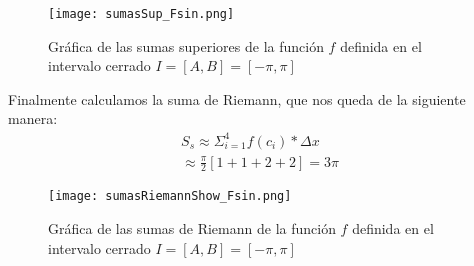 \begin{ejer}[3]
			    \begin{figure}[h]
				    \texttt{[image: sumasSup\_Fsin.png]}
				    \caption{Gráfica de las sumas superiores de la función $f$ definida en el intervalo cerrado $I = [A,B] = [-\pi,\pi]$}
			    \end{figure}
			    Finalmente calculamos la suma de Riemann, que nos queda de la siguiente manera: 
			    \begin{eqnarray*}
			        S_s \approx \Sigma_{i=1}^4 f(c_i) * \Delta x \\
			        \approx \frac{\pi}{2} [1 + 1 + 2 + 2] = 3 \pi 
			    \end{eqnarray*}
			    \begin{figure}[h]
				    \texttt{[image: sumasRiemannShow\_Fsin.png]}
				    \caption{Gráfica de las sumas de Riemann de la función $f$ definida en el intervalo cerrado $I = [A,B] = [-\pi,\pi]$}
			    \end{figure}
			\end{ejer}
